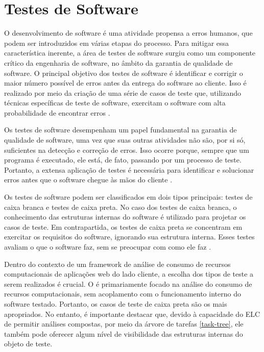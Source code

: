 \documentclass[12pt]{tcc}
\begin{document}
		\section{Testes de Software}
		\label{cap:software-testing}
		O desenvolvimento de software é uma atividade propensa a erros humanos, que podem ser introduzidos em várias etapas do processo.
		Para mitigar essa característica inerente, a área de testes de software surgiu como um componente crítico da engenharia de software, no âmbito da garantia de qualidade de software.
		O principal objetivo dos testes de software é identificar e corrigir o maior número possível de erros antes da entrega do software ao cliente.
		Isso é realizado por meio da criação de uma série de casos de teste que, utilizando técnicas específicas de teste de software, exercitam o software com alta probabilidade de encontrar erros \citep{pressman2009software}.

		Os testes de software desempenham um papel fundamental na garantia de qualidade de software, uma vez que suas outras atividades não são, por si só, suficientes na detecção e correção de erros.
		Isso ocorre porque, sempre que um programa é executado, ele está, de fato, passando por um processo de teste.
		Portanto, a extensa aplicação de testes é necessária para identificar e solucionar erros antes que o software chegue às mãos do cliente \citep{pressman2009software}.

		Os testes de software podem ser classificados em dois tipos principais: testes de caixa branca e testes de caixa preta.
		No caso dos testes de caixa branca, o conhecimento das estruturas internas do software é utilizado para projetar os casos de teste.
		Em contrapartida, os testes de caixa preta se concentram em exercitar os requisitos do software, ignorando sua estrutura interna. Esses testes avaliam o que o software faz, sem se preocupar com como ele faz \citep{pressman2009software}.

		Dentro do contexto de um framework de análise de consumo de recursos computacionais de aplicações web do lado cliente, a escolha dos tipos de teste a serem realizados é crucial.
		O  é primariamente focado na análise do consumo de recursos computacionais, sem acoplamento com o funcionamento interno do software testado.
		Portanto, os casos de teste de caixa preta são os mais apropriados.
		No entanto, é importante destacar que, devido à capacidade do ELC de permitir análises compostas, por meio da árvore de tarefas \ref{task-tree}, ele também pode oferecer algum nível de visibilidade das estruturas internas do objeto de teste.
\end{document}
